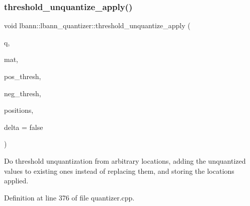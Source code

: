 \subsubsection{\texorpdfstring{threshold\+\_\+unquantize\+\_\+apply()}{threshold\_unquantize\_apply()}}
{\footnotesize\ttfamily void lbann\+::lbann\+\_\+quantizer\+::threshold\+\_\+unquantize\+\_\+apply (\begin{DoxyParamCaption}\item[{const \hyperlink{classlbann_1_1lbann__quantizer_a85ea8e298c2975b4f802855278406aa7}{Thresh\+Quantized} \&}]{q,  }\item[{\hyperlink{base_8hpp_a68f11fdc31b62516cb310831bbe54d73}{Mat} \&}]{mat,  }\item[{Data\+Type}]{pos\+\_\+thresh,  }\item[{Data\+Type}]{neg\+\_\+thresh,  }\item[{std\+::vector$<$ El\+::\+Unsigned $>$ \&}]{positions,  }\item[{bool}]{delta = {\ttfamily false} }\end{DoxyParamCaption})\hspace{0.3cm}{\ttfamily [private]}}

Do threshold unquantization from arbitrary locations, adding the unquantized values to existing ones instead of replacing them, and storing the locations applied. 

Definition at line 376 of file quantizer.\+cpp.


